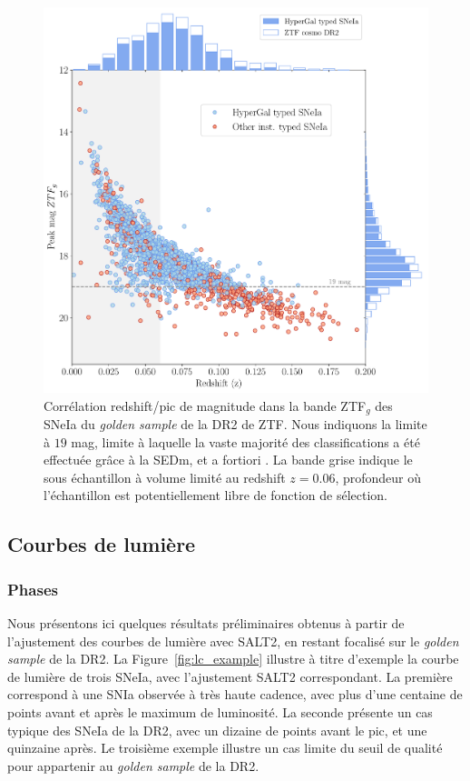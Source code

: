 \documentclass[../main/main.tex]{subfiles}
\begin{document}
\begin{figure}[ht!]
  \centering
  \includegraphics[width=1\textwidth]{../figures/09_dr2/peakvsredshift_dr2.pdf}
  \caption[Corrélation redshift/pic de magnitude (ZTF$_{g}$) du
  \textit{golden sample} de la DR2 de ZTF.]{Corrélation redshift/pic de
    magnitude dans la bande ZTF$_{g}$ des SNeIa du
  \textit{golden sample} de la DR2 de ZTF. Nous indiquons la limite à
  $19$ mag, limite à laquelle la vaste majorité des classifications a
  été effectuée grâce à la SEDm, et a fortiori \hypergal. La bande grise
 indique le sous échantillon à volume limité au redshift $z=0.06$,
 profondeur où l'échantillon est potentiellement libre de fonction de sélection.}
  \label{fig:peakmagztfg}
\end{figure}

\clearpage
\subsection{Courbes de lumière}

\subsubsection{Phases}
Nous présentons ici quelques résultats préliminaires obtenus à partir de
l'ajustement des courbes de lumière avec SALT2, en restant
focalisé sur le \textit{golden sample} de la DR2. La
Figure~\ref{fig:lc_example} illustre à titre d'exemple la courbe de lumière de trois
SNeIa, avec l'ajustement SALT2 correspondant. La première correspond à
une SNIa observée à très haute cadence, avec plus d'une centaine de
points avant et après le maximum de luminosité. La seconde présente un
cas typique des SNeIa de la DR2, avec un dizaine de points avant le pic,
et une quinzaine après. Le troisième exemple illustre un cas limite du
seuil de qualité pour appartenir au \textit{golden sample} de la DR2.
\end{document}
